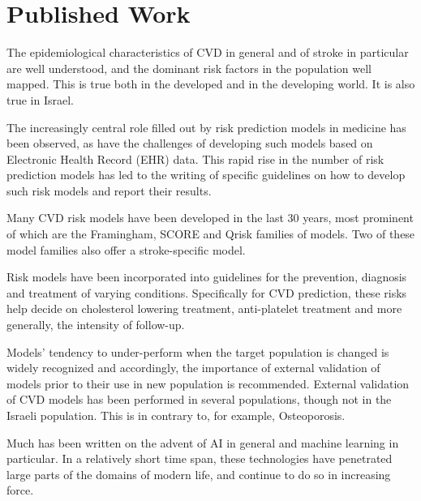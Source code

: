 \documentclass[a4paper,12pt]{article}
\begin{document}
	\section{Published Work}
	
	The epidemiological characteristics of CVD in general and of stroke in particular are well understood\cite{Koton2014,Vangen-Loenne2017}, and the dominant risk factors in the population well mapped\cite{Yusuf2004,ODonnell2016}. This is true both in the developed and in the developing world\cite{Lozano2012}. It is also true in Israel\cite{ICDC2017}.
	
	The increasingly central role filled out by risk prediction models in medicine has been observed\cite{Moons2009}, as have the challenges of developing such models based on Electronic Health Record (EHR) data\cite{Goldstein2016,Goldstein2017}. This rapid rise in the number of risk prediction models has led to the writing of specific guidelines on how to develop such risk models and report their results\cite{Collins2015}.
	
	Many CVD risk models have been developed in the last 30 years, most prominent of which are the Framingham\cite{Wilson1998,NationalCholesterolEducationProgramNCEPExpertPanelonDetection2002,DAgostino2008,Goff2014}, SCORE\cite{Conroy2003} and Qrisk\cite{Hippisley-Cox2007,Hippisley-Cox2008} families of models.	Two of these model families also offer a stroke-specific model\cite{Wolf1991,DAgostino1994,Hippisley-Cox2013}.
	
	Risk models have been incorporated into guidelines for the prevention, diagnosis and treatment of varying conditions. Specifically for CVD prediction, these risks help decide on cholesterol lowering treatment, anti-platelet treatment and more generally, the intensity of follow-up\cite{NationalCholesterolEducationProgramNCEPExpertPanelonDetection2002,Graham2007,Goff2014,Bibbins-Domingo2016}.
	
	Models' tendency to under-perform when the target population is changed is widely recognized\cite{DAgostino2001,Bastuji-Garin2002,DeFilippis2015} and accordingly, the importance of external validation of models prior to their use in new population is recommended\cite{Moons2012}. External validation of CVD models has been performed in several populations\cite{DAgostino2001,Bastuji-Garin2002,DeFilippis2015}, though not in the Israeli population\cite{Bitzur2015}. This is in contrary to, for example, Osteoporosis\cite{Dagan2017}.
	
	Much has been written on the advent of AI in general and machine learning in particular. In a relatively short time span, these technologies have penetrated large parts of the domains of modern life, and continue to do so in increasing force\cite{Ng2017}.
	
\end{document}
